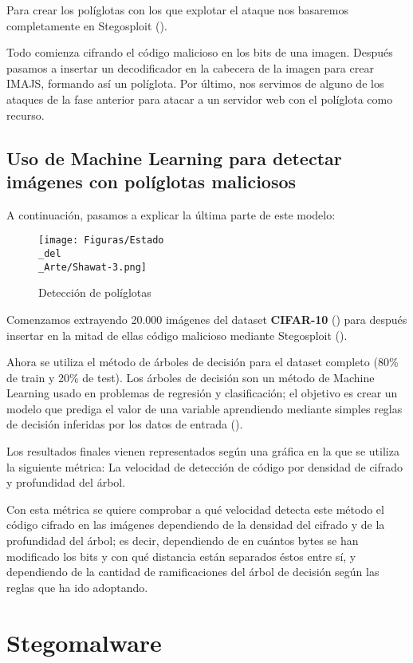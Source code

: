 Para crear los políglotas con los que explotar el ataque nos basaremos completamente en Stegosploit (\cite{stegosploit}).

Todo comienza cifrando el código malicioso en los bits de una imagen. Después pasamos a insertar un decodificador en la cabecera de la imagen para crear IMAJS, formando así un políglota. Por último, nos servimos de alguno de los ataques de la fase anterior para atacar a un servidor web con el políglota como recurso.

\subsection{Uso de Machine Learning para detectar imágenes con políglotas maliciosos}

A continuación, pasamos a explicar la última parte de este modelo:

\begin{figure}[H]
  \centering
  \texttt{[image: Figuras/Estado\\\_del\\\_Arte/Shawat-3.png]}
  \label{fig:shawat-3}
  \caption{Detección de políglotas}
\end{figure}

Comenzamos extrayendo 20.000 imágenes del dataset \textbf{CIFAR-10} (\cite{cifar10}) para después insertar en la mitad de ellas código malicioso mediante Stegosploit (\cite{stegosploit}). %

Ahora se utiliza el método de árboles de decisión para el dataset completo (80\% de train y 20\% de test). Los árboles de decisión son un método de Machine Learning usado en problemas de regresión y clasificación; el objetivo es crear un modelo que prediga el valor de una variable aprendiendo mediante simples reglas de decisión inferidas por los datos de entrada (\cite{decision-trees}). %

Los resultados finales vienen representados según una gráfica en la que se utiliza la siguiente métrica: La velocidad de detección de código por densidad de cifrado y profundidad del árbol.

Con esta métrica se quiere comprobar a qué velocidad detecta este método el código cifrado en las imágenes dependiendo de la densidad del cifrado y de la profundidad del árbol; es decir, dependiendo de en cuántos bytes se han modificado los bits y con qué distancia están separados éstos entre sí, y dependiendo de la cantidad de ramificaciones del árbol de decisión según las reglas que ha ido adoptando.

\section{Stegomalware}

